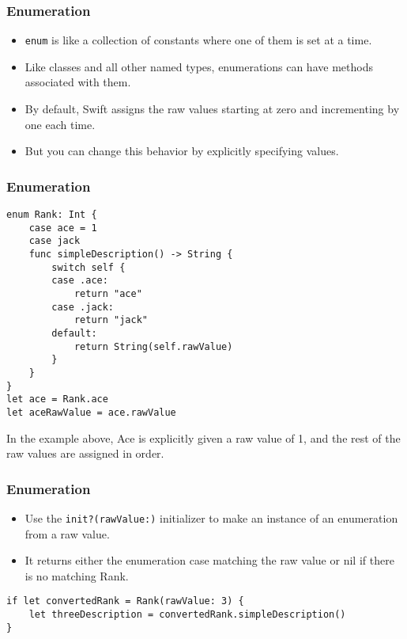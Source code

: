 \begin{frame}[fragile] \frametitle{Enumeration}

\begin{itemize}
\item \lstinline|enum| is like a collection of constants where one of them is set at a time. 
\item Like classes and all other named types, enumerations can have methods associated with them.
\item By default, Swift assigns the raw values starting at zero and incrementing by one each time.
\item But you can change this behavior by explicitly specifying values. 
\end{itemize}

\end{frame}


\begin{frame}[fragile] \frametitle{Enumeration}
\begin{lstlisting}[basicstyle=\scriptsize]
enum Rank: Int {
    case ace = 1
    case jack
    func simpleDescription() -> String {
        switch self {
        case .ace:
            return "ace"
        case .jack:
            return "jack"
        default:
            return String(self.rawValue)
        }
    }
}
let ace = Rank.ace
let aceRawValue = ace.rawValue
\end{lstlisting}
In the example above, Ace is explicitly given a raw value of 1, and the rest of the raw values are assigned in order.

\end{frame}

\begin{frame}[fragile] \frametitle{Enumeration}

\begin{itemize}
\item Use the \lstinline|init?(rawValue:)| initializer to make an instance of an enumeration from a raw value. 
\item It returns either the enumeration case matching the raw value or nil if there is no matching Rank.
\end{itemize}

\begin{lstlisting}[basicstyle=\scriptsize]
if let convertedRank = Rank(rawValue: 3) {
    let threeDescription = convertedRank.simpleDescription()
}
\end{lstlisting}
\end{frame}

